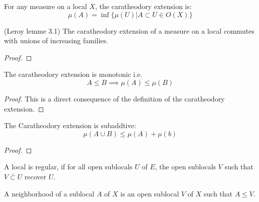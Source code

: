 \begin{definition}[Caratheodory]
    \leanok
    \label{def:caratheodory}
    For any measure on a local $X$, the caratheodory extension is:
    \[\mu(A) = \inf \{\mu(U) | A \subset U \in O(X)\}\]
\end{definition}

\begin{lemma}
(Leroy lemme 3.1)
    \label{lem:commutes_with_sup}
    \leanok
    The caratheodory extension of a measure on a local commutes with unions of increasing families.
\end{lemma}
\begin{proof}
    \leanok
\end{proof}

\begin{lemma}
    \label{lem:monotonic}
    \leanok
    The caratheodory extension is monotonic i.e. \[A \le B \implies \mu (A) \le \mu (B)\]
\end{lemma}
\begin{proof}
    \leanok
    This is a direct consequence of the definition of the caratheodory extension.
\end{proof}

\begin{lemma}[Subadditivity]
    \label{lem:caratheodory_subaddtive}
    The Caratheodory extension is subaddtive:
    $$\mu(A \cup B) \le \mu(A) + \mu(b)$$
    \leanok
\end{lemma}
\begin{proof}
    \leanok
\end{proof}

\begin{definition}
    \label{def:regular_local}
    \leanok
    A local is regular, if for all open sublocals $U$ of $E$, the open sublocals $V$ such that $V\bar \subset U$ recover $U$.
\end{definition}



\begin{definition}[Neighborhood]
    \label{def:neighborhood}
    \leanok

    A neighborhood of a sublocal $A$ of $X$ is an open sublocal $V$ of $X$ such that $A \le V$.
\end{definition}

